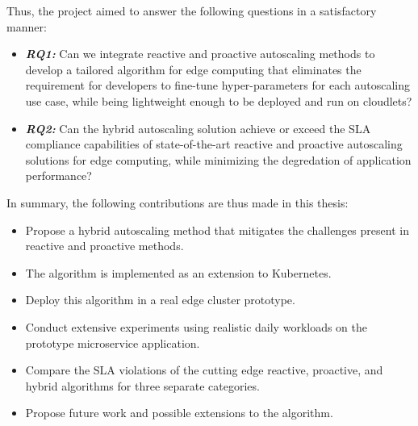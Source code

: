 Thus, the project aimed to answer the following questions in a satisfactory manner:
\begin{itemize}
    \item \textbf{\textit{RQ1:}} Can we integrate reactive and proactive autoscaling methods to develop a tailored algorithm for edge computing that eliminates the requirement for developers to fine-tune hyper-parameters for each autoscaling use case, while being lightweight enough to be deployed and run on cloudlets?
    \item \textbf{\textit{RQ2:}} Can the hybrid autoscaling solution achieve or exceed the SLA compliance capabilities of state-of-the-art reactive and proactive autoscaling solutions for edge computing, while minimizing the degredation of application performance?
\end{itemize}

In summary, the following contributions are thus made in this thesis:

\begin{itemize}
    \item Propose a hybrid autoscaling method that mitigates the challenges present in reactive and proactive methods.
    \item The algorithm is implemented as an extension to Kubernetes.
    \item Deploy this algorithm in a real edge cluster prototype.
    \item Conduct extensive experiments using realistic daily workloads on the prototype microservice application.
    \item Compare the SLA violations of the cutting edge reactive, proactive, and hybrid algorithms for three separate categories.
    \item Propose future work and possible extensions to the algorithm.
\end{itemize}
